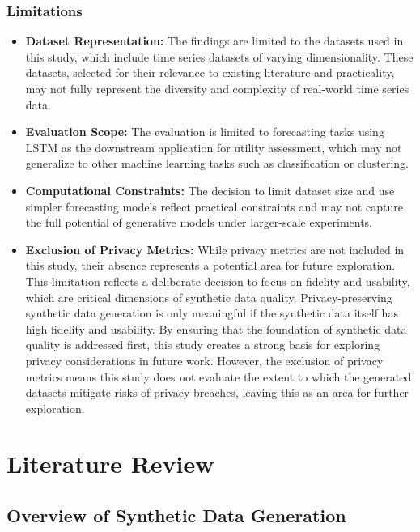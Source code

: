\documentclass{article}
\begin{document}
\subsubsection{Limitations}
\begin{itemize}
    \item \textbf{Dataset Representation:} The findings are limited to the datasets used in this study, which include time series datasets of varying dimensionality.  These datasets, selected for their relevance to existing literature and practicality, may not fully represent the diversity and complexity of real-world time series data.

    \item \textbf{Evaluation Scope:} The evaluation is limited to forecasting tasks using LSTM as the downstream application for utility assessment, which may not generalize to other machine learning tasks such as classification or clustering.
    
    \item \textbf{Computational Constraints:} The decision to limit dataset size and use simpler forecasting models reflect practical constraints and may not capture the full potential of generative models under larger-scale experiments.

    \item \textbf{Exclusion of Privacy Metrics: } While privacy metrics are not included in this study, their absence represents a potential area for future exploration. This limitation reflects a deliberate decision to focus on fidelity and usability, which are critical dimensions of synthetic data quality. Privacy-preserving synthetic data generation is only meaningful if the synthetic data itself has high fidelity and usability. By ensuring that the foundation of synthetic data quality is addressed first, this study creates a strong basis for exploring privacy considerations in future work. However, the exclusion of privacy metrics means this study does not evaluate the extent to which the generated datasets mitigate risks of privacy breaches, leaving this as an area for further exploration.

\end{itemize}


\newpage
\section{Literature Review}

\subsection{Overview of Synthetic Data Generation}
\end{document}
